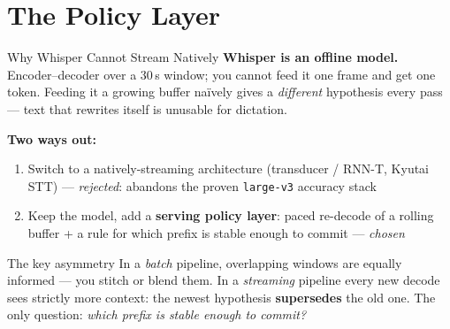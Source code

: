 \documentclass{beamer}
\begin{document}
\section{The Policy Layer}

\begin{frame}{Why Whisper Cannot Stream Natively}
    \footnotesize
    \textbf{Whisper is an offline model.} Encoder--decoder over a 30\,s window;
    you cannot feed it one frame and get one token. Feeding it a growing buffer
    na\"ively gives a \emph{different} hypothesis every pass --- text that rewrites
    itself is unusable for dictation.

    \vspace{0.3em}
    \textbf{Two ways out:}
    \begin{enumerate}\setlength{\itemsep}{2pt}
        \item Switch to a natively-streaming architecture (transducer / RNN-T,
              Kyutai STT) --- \emph{rejected}: abandons the proven
              \texttt{large-v3} accuracy stack
        \item Keep the model, add a \textbf{serving policy layer}: paced re-decode
              of a rolling buffer + a rule for which prefix is stable enough to
              commit --- \emph{chosen}
    \end{enumerate}

    \vspace{0.3em}
    \begin{block}{\footnotesize The key asymmetry}
        \footnotesize
        In a \emph{batch} pipeline, overlapping windows are equally informed ---
        you stitch or blend them. In a \emph{streaming} pipeline every new decode
        sees strictly more context: the newest hypothesis \textbf{supersedes} the
        old one. The only question: \emph{which prefix is stable enough to commit?}
    \end{block}
\end{frame}
\end{document}
